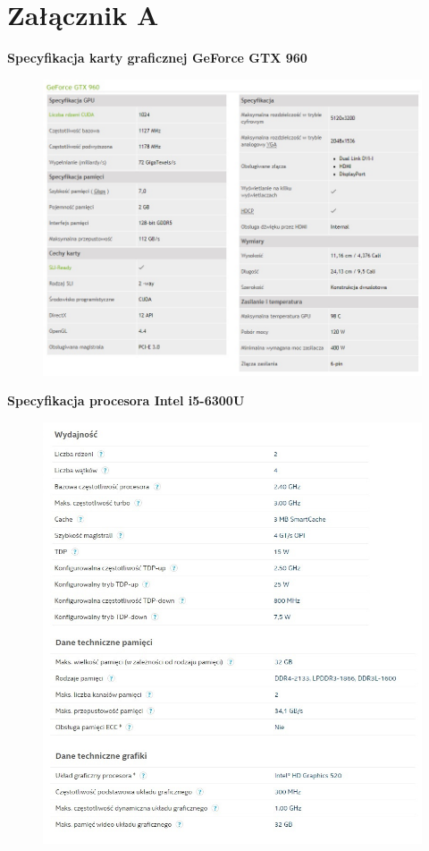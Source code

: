 \documentclass[document.tex]{subfiles}
\begin{document}
\chapter*{Załącznik A}

\textbf{\Large{Specyfikacja karty graficznej GeForce GTX 960}}

\begin{figure}[h]
\includegraphics[scale=0.75]{imgs/gtx960_spec.jpg}
\caption*{}
\label{fig:results_pc_serial}
\end{figure}
\clearpage

\textbf{\Large{Specyfikacja procesora Intel i5-6300U}}

\begin{figure}[h]
\includegraphics[scale=0.75]{imgs/intel_i56300u520_spec.jpg}
\caption*{}
\label{fig:intel_i56300u}
\end{figure}
\end{document}
